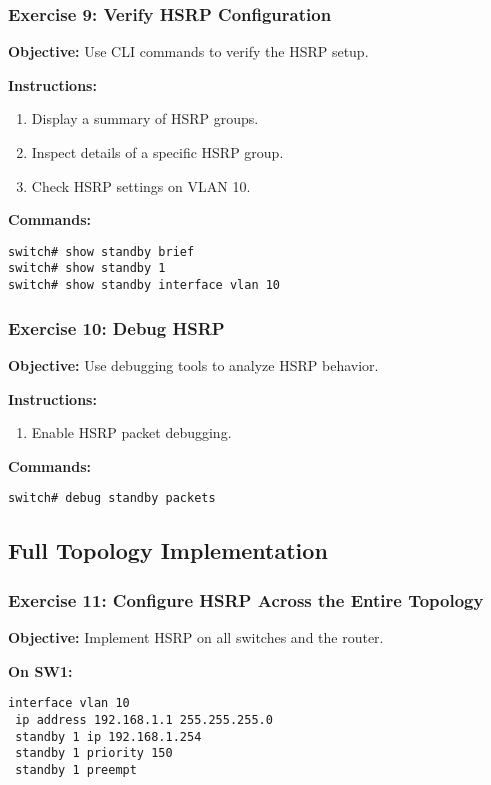\documentclass[12pt]{article}
\begin{document}
\subsubsection*{Exercise 9: Verify HSRP Configuration}
\textbf{Objective:} Use CLI commands to verify the HSRP setup.

\textbf{Instructions:}
\begin{enumerate}
\item Display a summary of HSRP groups.
\item Inspect details of a specific HSRP group.
\item Check HSRP settings on VLAN 10.
\end{enumerate}

\textbf{Commands:}
\begin{lstlisting}[style=CiscoCLI]
switch# show standby brief
switch# show standby 1
switch# show standby interface vlan 10
\end{lstlisting}

\bigskip

\subsubsection*{Exercise 10: Debug HSRP}
\textbf{Objective:} Use debugging tools to analyze HSRP behavior.

\textbf{Instructions:}
\begin{enumerate}
\item Enable HSRP packet debugging.
\end{enumerate}

\textbf{Commands:}
\begin{lstlisting}[style=CiscoCLI]
switch# debug standby packets
\end{lstlisting}

\bigskip

\subsection{Full Topology Implementation}

\subsubsection*{Exercise 11: Configure HSRP Across the Entire Topology}
\textbf{Objective:} Implement HSRP on all switches and the router.

\textbf{On SW1:}
\begin{lstlisting}[style=CiscoCLI]
interface vlan 10
 ip address 192.168.1.1 255.255.255.0
 standby 1 ip 192.168.1.254
 standby 1 priority 150
 standby 1 preempt
\end{lstlisting}
\end{document}
